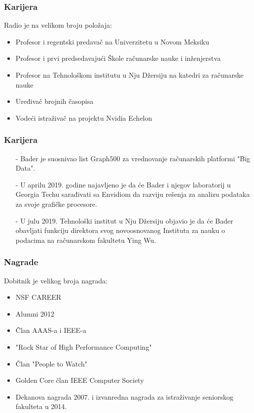 \documentclass{beamer}
\begin{document}
\begin{frame}
\frametitle{Karijera}
Radio je na velikom broju položaja:
\begin{itemize}
\item     Profesor i regentski predavač na Univerzitetu u Novom Meksiku
\item     Profesor i prvi predsedavajući Škole računarske nauke i inženjerstva
\item 	  Profesor na Tehnološkom institutu u Nju Džersiju na katedri za računarske nauke
\item     Uređivač brojnih časopisa
\item     Vodeći istraživač na projektu Nvidia Echelon
\end{itemize}
\end{frame}

\begin{frame}
\frametitle{Karijera}
\begin{itemize}

\item [-] Bader je suosnivao list Graph500 za vrednovanje računarskih platformi "Big Data".
\item [-] U aprilu 2019. godine najavljeno je da će Bader i njegov laboratorij u Georgia Techu sarađivati sa Envidiom da razviju rešenja za analizu podataka za svoje grafičke procesore.
\item [-] U julu 2019. Tehnološki institut u Nju Džersiju objavio je da će Bader obavljati funkciju direktora svog novoosnovanog Instituta za nauku o podacima na računarskom fakultetu Ying Wu.
\end{itemize}
\end{frame}




\begin{frame}
\frametitle{Nagrade} 
Dobitnik je velikog broja nagrada:
\begin{itemize}
\item     NSF CAREER
\item     Alumni 2012
\item     Član AAAS-a i IEEE-a
\item     "Rock Star of High Performance Computing"
\item     Član "People to Watch"
\item 	  Golden Core član IEEE Computer Society
\item     Dekanova nagrada 2007. i izvanredna nagrada za istraživanje seniorskog fakulteta u 2014.
\end{itemize}

\end{frame}
\end{document}
